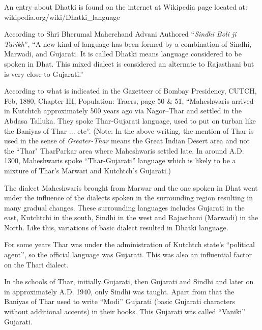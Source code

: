 An entry about Dhatki is found on the internet at Wikipedia page located at: wikipedia.org/wiki/Dhatki\_language

According to Shri Bherumal Maherchand Advani Authored ``\textit{Sindhi Boli ji
Tarikh}'', ``A new kind of language has been formed by a combination of Sindhi,
Marwadi, and Gujarati. It is called Dhatki means language considered to be
spoken in Dhat. This mixed dialect is considered an alternate to Rajasthani but
is very close to Gujarati.''

According to what is indicated in the Gazetteer of Bombay Presidency, CUTCH,
Feb, 1880, Chapter III, Population: Traers, page 50 \& 51, ``Maheshwaris arrived
in Kutchtch approximately 500 years ago via Nagor--Thar and settled in the
Abdasa Talluka. They spoke Thar-Gujarati language, used to put on turban like
the Baniyas of Thar ... etc''. (Note: In the above writing, the mention of Thar
is used in the sense of \textit{Greater-Thar} means the Great Indian Desert area
and not the ``Thar" TharParkar area where Maheshwaris settled late. In around
A.D. 1300, Maheshwaris spoke ``Thar-Gujarati'' language which is likely to be a
mixture of Thar's Marwari and Kutchtch's Gujarati.)

The dialect Maheshwaris brought from Marwar and the one spoken in Dhat went
under the influence of the dialects spoken in the surrounding region resulting
in many gradual changes. These surrounding languages includes Gujarati in the
east, Kutchtchi in the south, Sindhi in the west and Rajasthani (Marwadi) in the
North. Like this, variations of basic dialect resulted in Dhatki language.

For some years Thar was under the administration of Kutchtch state's ``political
agent'', so the official language was Gujarati. This was also an influential
factor on the Thari dialect.

In the schools of Thar, initially Gujarati, then Gujarati and Sindhi and later
on in approximately A.D. 1940, only Sindhi was taught. Apart from that the
Baniyas of Thar used to write ``Modi'' Gujarati (basic Gujarati characters
without additional accents) in their books. This Gujarati was called ``Vaniki''
Gujarati.

